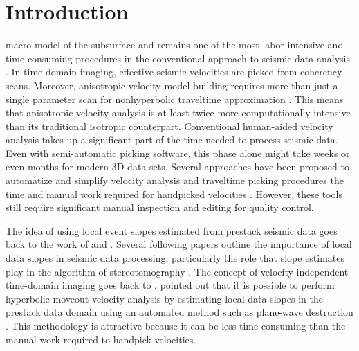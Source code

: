 \section{Introduction}

macro model of the subsurface and remains one of the most
labor-intensive and time-consuming procedures in the conventional
approach to seismic data analysis \citep{yilmaz}.  In time-domain
imaging, effective seismic velocities are picked from coherency
scans. Moreover, anisotropic velocity model building requires more
than just a single parameter scan for nonhyperbolic traveltime
approximation  \citep{alkhalifah:1550}. This
means that anisotropic velocity analysis is at least twice more
computationally intensive than its traditional isotropic counterpart.
Conventional human-aided velocity analysis takes up a significant part
of the time needed to process seismic data.  Even with semi-automatic
picking software, this phase alone might take weeks or even months for
modern 3D data sets. Several approaches have been proposed to
automatize and simplify velocity analysis and traveltime picking
procedures   the time
and manual work required for handpicked velocities
\citep{lambare:VE25,lambare:2076,Siliqi2007}.  However, these tools
still require significant manual inspection and editing for quality
control.

The idea of using local event slopes estimated from prestack seismic
data goes back to the work of \cite{rieber:97} and
\cite{riabinkin}. Several following papers outline the importance of
local data slopes in seismic data processing, particularly the role
that slope estimates play in the algorithm of stereotomography
\citep{Sword.sepphd.55,lambare:VE25,lambare:2076}.  The concept of
velocity-independent time-domain imaging goes back to
\cite{ottolini}. \cite{wolf:2423} pointed out that it is possible to
perform hyperbolic moveout velocity-analysis by estimating local data
slopes in the prestack data domain using an automated method such as
plane-wave destruction \citep{FomelPWD}. This methodology is
attractive because it can be less time-consuming than the manual work
required to handpick velocities.

